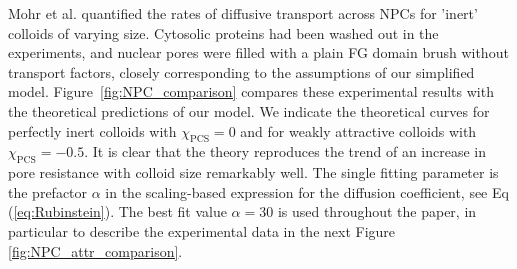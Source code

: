 \documentclass[12pt, a4paper]{article}
\begin{document}
Mohr et al. quantified the rates of diffusive transport across NPCs for 'inert' colloids of varying size. Cytosolic proteins had been washed out in the experiments, and nuclear pores were filled with a plain FG domain brush without transport factors, closely corresponding to the assumptions of our simplified model. Figure~\ref{fig:NPC_comparison} compares these experimental results with the theoretical predictions of our model. We indicate the theoretical curves for perfectly inert colloids with $\chi_{\text{PCS}} = 0$ and for weakly attractive colloids with $\chi_{\text{PCS}} = -0.5$. It is clear that the theory reproduces the trend of an increase in pore resistance with colloid size remarkably well. The single fitting parameter is the prefactor $\alpha$ in the scaling-based expression for the diffusion coefficient, see Eq (\ref{eq:Rubinstein}). The best fit value $\alpha=30$ is used throughout the paper, in particular to describe the experimental data in the next Figure \ref{fig:NPC_attr_comparison}.



\end{document}
